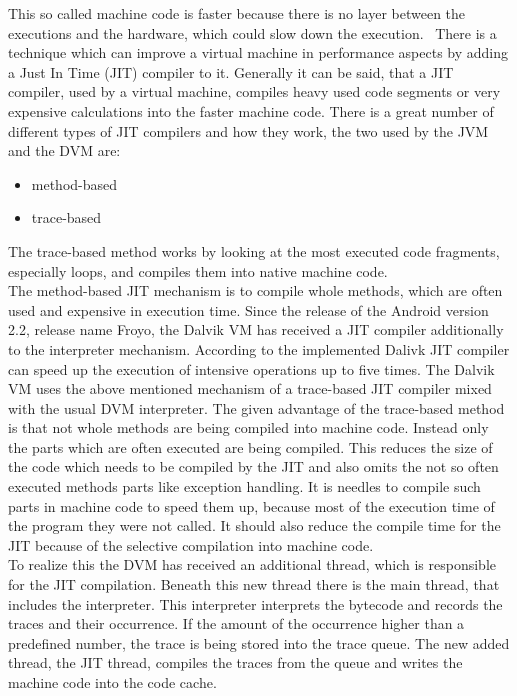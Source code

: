 This so called machine code is faster because there is no layer between the executions and the hardware, which could slow down the execution.~\cite{aycock2003brief}
There is a technique which can improve a virtual machine in performance aspects by adding a Just In Time (JIT) compiler to it.
Generally it can be said, that a JIT compiler, used by a virtual machine, compiles heavy used code segments or very expensive calculations into the faster machine code.
There is a great number of different types of JIT compilers and how they work, the two used by the JVM and the DVM are:
\begin{itemize}
\item method-based
\item trace-based
\end{itemize}
The trace-based method works by looking at the most executed code fragments, especially loops, and compiles them into native machine code.\\
The method-based JIT mechanism is to compile whole methods, which are often used and expensive in execution time.
Since the release of the Android version 2.2, release name Froyo, the Dalvik VM has received a JIT compiler additionally to the interpreter mechanism.
According to \cite{cheng2010jit} the implemented Dalivk JIT compiler can speed up the execution of intensive operations up to five times.
The Dalvik VM uses the above mentioned mechanism of a trace-based JIT compiler mixed with the usual DVM interpreter.
The given advantage of the trace-based method is that not whole methods are being compiled into machine code.
Instead only the parts which are often executed are being compiled.
This reduces the size of the code which needs to be compiled by the JIT and also omits the not so often executed methods parts like exception handling.
It is needles to compile such parts in machine code to speed them up, because most of the execution time of the program they were not called.
It should also reduce the compile time for the JIT because of the selective compilation into machine code.\\
To realize this the DVM has received an additional thread, which is responsible for the JIT compilation.
Beneath this new thread there is the main thread, that includes the interpreter.
This interpreter interprets the bytecode and records the traces and their occurrence.
If the amount of the occurrence higher than a predefined number, the trace is being stored into the trace queue.
The new added thread, the JIT thread, compiles the traces from the queue and writes the machine code into the code cache.
